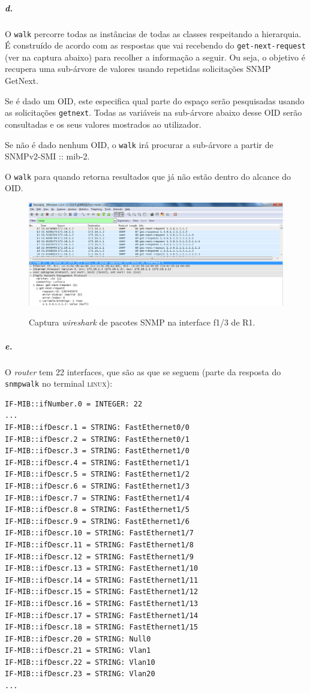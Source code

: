 \subparagraph{d.}
O \texttt{walk} percorre todas as instâncias de todas as classes respeitando a hierarquia. É construído de  acordo com  as  respostas  que  vai  recebendo  do  \texttt{get-next-request} (ver  na captura abaixo) para recolher a informação a seguir.
Ou seja, o objetivo é recupera uma sub-árvore de valores usando repetidas solicitações SNMP GetNext.

Se é dado um OID, este especifica qual parte do espaço serão pesquisadas usando as solicitações \texttt{getnext}. Todas as variáveis na sub-árvore abaixo desse OID serão consultadas e os seus valores mostrados ao utilizador.

Se não é dado nenhum OID, o \texttt{walk} irá procurar a sub-árvore a partir de SNMPv2-SMI :: mib-2.

O \texttt{walk} para quando retorna resultados que já não estão dentro do alcance do OID.

\begin{figure}[h]
\centering
\includegraphics[width=1\textwidth, height=0.3\textheight]{5d.png}
\label{fig:7-capturaWireshark}
\caption{Captura \emph{wireshark} de pacotes SNMP na interface \textsf{f1/3} de \textsf{R1}.}
\end{figure}

\newpage

\subparagraph{e.}
O \emph{router} tem 22 interfaces, que são as que se seguem (parte da resposta do \texttt{snmpwalk} no terminal \textsc{linux}):

\begin{verbatim}
IF-MIB::ifNumber.0 = INTEGER: 22
...
IF-MIB::ifDescr.1 = STRING: FastEthernet0/0
IF-MIB::ifDescr.2 = STRING: FastEthernet0/1
IF-MIB::ifDescr.3 = STRING: FastEthernet1/0
IF-MIB::ifDescr.4 = STRING: FastEthernet1/1
IF-MIB::ifDescr.5 = STRING: FastEthernet1/2
IF-MIB::ifDescr.6 = STRING: FastEthernet1/3
IF-MIB::ifDescr.7 = STRING: FastEthernet1/4
IF-MIB::ifDescr.8 = STRING: FastEthernet1/5
IF-MIB::ifDescr.9 = STRING: FastEthernet1/6
IF-MIB::ifDescr.10 = STRING: FastEthernet1/7
IF-MIB::ifDescr.11 = STRING: FastEthernet1/8
IF-MIB::ifDescr.12 = STRING: FastEthernet1/9
IF-MIB::ifDescr.13 = STRING: FastEthernet1/10
IF-MIB::ifDescr.14 = STRING: FastEthernet1/11
IF-MIB::ifDescr.15 = STRING: FastEthernet1/12
IF-MIB::ifDescr.16 = STRING: FastEthernet1/13
IF-MIB::ifDescr.17 = STRING: FastEthernet1/14
IF-MIB::ifDescr.18 = STRING: FastEthernet1/15
IF-MIB::ifDescr.20 = STRING: Null0
IF-MIB::ifDescr.21 = STRING: Vlan1
IF-MIB::ifDescr.22 = STRING: Vlan10
IF-MIB::ifDescr.23 = STRING: Vlan20
...
\end{verbatim}

